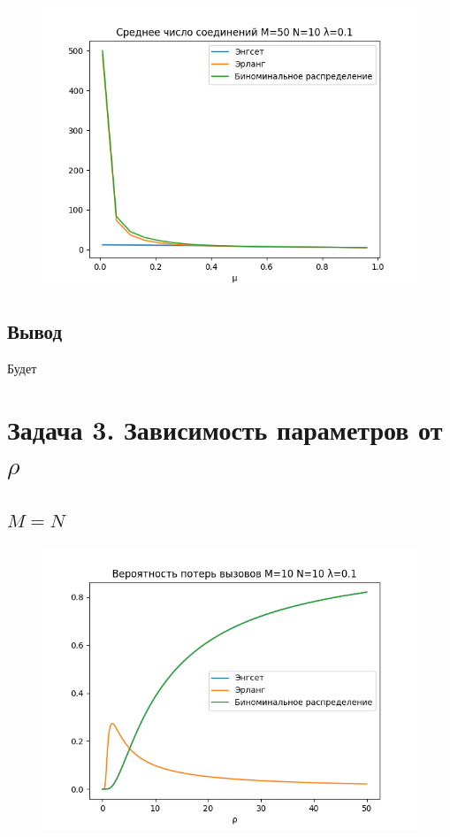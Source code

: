\documentclass[12pt]{article}
\let\Oldsection\section
\renewcommand{\section}{\FloatBarrier\Oldsection}
\let\Oldsubsection\subsection
\renewcommand{\subsection}{\FloatBarrier\Oldsubsection}
\begin{document}
\begin{figure}[!htb]
\centering
\includegraphics[scale=1.00]{assets/iss_2/aver_conn_M50_N10_lam01.png}
\caption{}
\label{}
\end{figure}

\subsection{Вывод}
Будет


\section{Задача 3. Зависимость параметров от $\rho$}
\subsection{$M = N$}
\begin{figure}[!htb]
\centering
\includegraphics[scale=1.00]{assets/iss_3/loss_prob_M10_N10_lam01.png}
\caption{}
\label{}
\end{figure}
\end{document}
